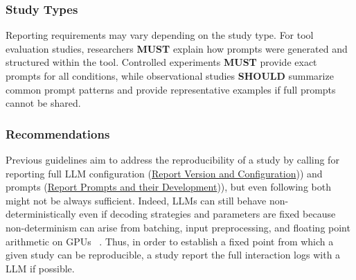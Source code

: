 
\subsubsection{Study Types}
Reporting requirements may vary depending on the study type. For tool evaluation studies, researchers \textbf{MUST} explain how prompts were generated and structured within the tool. Controlled experiments \textbf{MUST} provide exact prompts for all conditions, while observational studies \textbf{SHOULD} summarize common prompt patterns and provide representative examples if full prompts cannot be shared.


\subsubsection{Recommendations}




Previous guidelines aim to address the reproducibility of a study by calling for reporting full LLM configuration (\href{/guidelines/#report-veersion-and-configuration}{Report Version and Configuration})) and prompts (\href{/guidelines/#report-prompts}{Report Prompts and their Development})), but even following both might not be always sufficient. Indeed, LLMs can still behave non-deterministically even if decoding strategies and parameters are fixed because non-determinism can arise from batching, input preprocessing, and floating point arithmetic on GPUs ~\cite{Chann2023}. Thus, in order to establish a fixed point from which a given study can be reproducible, a study \should report the full interaction logs with a LLM if possible. 


